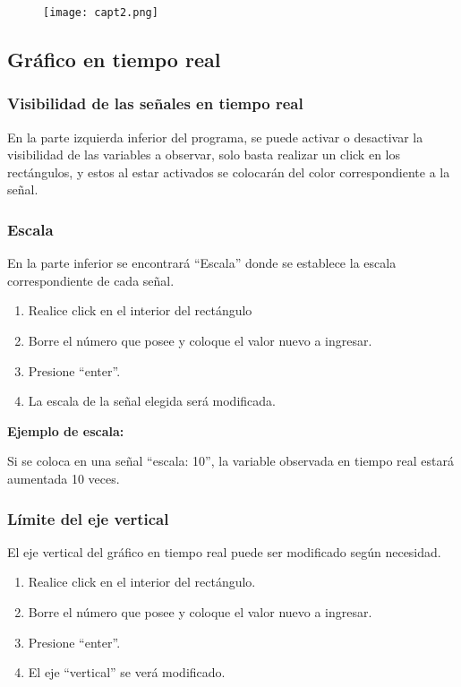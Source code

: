 \begin{figure}[H]
	\centering
	\texttt{[image: capt2.png]}
	\label{fig:capt2}
\end{figure}



\subsection{Gráfico en tiempo real}
\subsubsection{Visibilidad de las señales en tiempo real}
En la parte izquierda inferior del programa, se puede activar o desactivar la visibilidad de las variables a observar, solo basta realizar un click en los rectángulos, y estos al estar activados se colocarán del color correspondiente a la señal.

\subsubsection{Escala}
En la parte inferior se encontrará “Escala” donde se establece la escala correspondiente de cada señal.
\begin{enumerate}
	\item Realice click en el interior del rectángulo
	\item Borre el número que posee y coloque el valor nuevo a ingresar.
	\item Presione “enter”.
	\item La escala de la señal elegida será modificada.
	
\end{enumerate}

\textbf{Ejemplo de escala:}

Si se coloca en una señal “escala: 10”, la variable observada en tiempo real estará aumentada 10 veces.

\subsubsection{Límite del eje vertical}
El eje vertical del gráfico en tiempo real puede ser modificado según necesidad.

\begin{enumerate}
	\item Realice click en el interior del rectángulo.
	\item Borre el número que posee y coloque el valor nuevo a ingresar.
	\item Presione “enter”.
	\item El eje “vertical” se verá modificado.
	
\end{enumerate}


